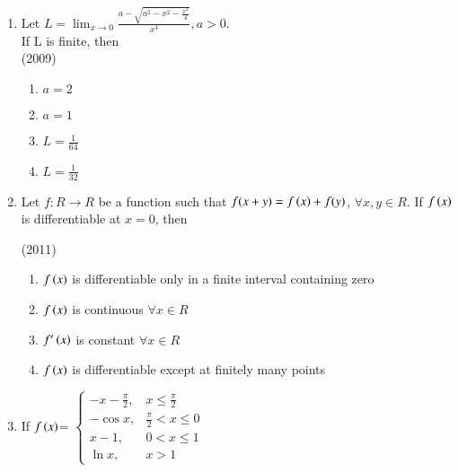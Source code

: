 \documentclass[journal,12pt,twocolumn]{IEEEtran}
\theoremstyle{remark}
\begin{document}
\begin{enumerate}
    \item
\begin{flushleft}
   
    {Let $L=\lim_{x \to0}\frac{a-\sqrt{a^2-x^2-\frac{x^2}{4}}}{x^4}, a>0$.\\ If L is finite, then} \\

    \hfill
    {(2009)}
   
    \begin{enumerate}[label=(\alph*)]
       
        \item $a=2$
        \item $a=1$
        \item $L=\frac{1}{64}$
        \item $L=\frac{1}{32}$
    \end{enumerate}
\end{flushleft}

    \item
\begin{flushleft}
   
    {Let $f:R \to R$ be a function such that $f(x+y)=f\left(x\right)+f(y)$, $\forall x,y\in R$. If $f\left(x\right)$ is differentiable at $x=0$, then}

    \hfill
    {(2011)}
   
    \begin{enumerate}[label=(\alph*)]
       
        \item $f\left(x\right)$ is differentiable only in a finite interval containing zero
        \item $f\left(x\right)$ is continuous $\forall x\in R$
        \item $f'\left(x\right)$ is constant $\forall x\in R$
        \item $f\left(x\right)$ is differentiable except at finitely many points
    \end{enumerate}
\end{flushleft}

    \item
\begin{flushleft}
   
    {If $f\left(x\right)$=
    $\begin{cases}
        -x-\frac{\pi}{2}, & x\leq \frac{\pi}{2} \\
        -\cos x, & \frac{\pi}{2}<x\leq 0 \\
        x-1, & 0<x\leq1 \\
        \ln x, & x>1
    \end{cases}$}


\end{flushleft}
\end{enumerate}
\end{document}
